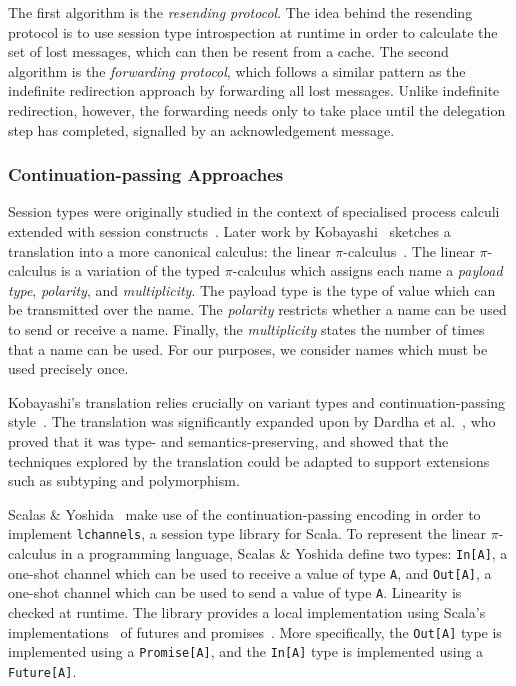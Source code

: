 \documentclass[
graybox,
envcountchap
]{svmult}
\begin{document}
\begin{bibunit}
  The first algorithm is the \emph{resending protocol}. The idea behind the
  resending protocol is to use session type introspection at runtime in order to
  calculate the set of lost messages, which can then be resent from a cache. The
  second algorithm is the \emph{forwarding protocol}, which follows a similar
  pattern as the indefinite redirection approach by forwarding all lost
  messages. Unlike indefinite redirection, however, the forwarding needs only to
  take place until the delegation step has completed, signalled by an
  acknowledgement message.

  \subsubsection{Continuation-passing Approaches}

  Session types were originally studied in the context of specialised process
  calculi extended with session constructs~\cite{Honda93:dyadic,
  HondaVK98:primitives}. Later work by Kobayashi~\cite{Kobayashi02:type-systems}
  sketches a translation into a more canonical calculus: the linear
  $\pi$-calculus~\cite{KobayashiPT99:linear-pi}. The linear $\pi$-calculus is a
  variation of the typed $\pi$-calculus which assigns each name a \emph{payload type},
  \emph{polarity}, and \emph{multiplicity}. The payload type is the type of
  value which can be transmitted over the name. The \emph{polarity} restricts
  whether a name can be used to send or receive a name. Finally, the
  \emph{multiplicity} states the number of times that a name can be used. For
  our purposes, we consider names which must be used precisely once.

  Kobayashi's translation relies crucially on variant types and continuation-passing
  style~\cite{SussmanS98:scheme}. The translation was significantly
  expanded upon by Dardha et al.~\cite{DardhaGS17:revisited}, who proved that
  it was type- and semantics-preserving, and showed that the
  techniques explored by the translation could be adapted to support extensions
  such as subtyping and polymorphism.

  Scalas \& Yoshida~\cite{ScalasY16:session-scala} make use of the
  continuation-passing encoding in order to implement \texttt{lchannels}, a
  session type library for Scala.
  To represent the linear $\pi$-calculus in a programming language, Scalas \&
  Yoshida define two types: \verb+In[A]+, a one-shot channel which can be used
  to receive a value of type \verb+A+, and \verb+Out[A]+, a one-shot channel
  which can be used to send a value of type \verb+A+.
  Linearity is checked at runtime. The library provides a
  local implementation using Scala's
  implementations~\cite{HallerPMKKJ:futures} of futures and
  promises~\cite{LiskovS88:promises}. More specifically, the \verb+Out[A]+ type
  is implemented using a \verb+Promise[A]+, and the \verb+In[A]+ type is
  implemented using a \verb+Future[A]+.


\end{bibunit}
\end{document}
